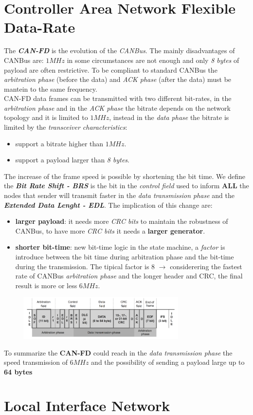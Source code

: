 \section{Controller Area Network Flexible Data-Rate}
The \textbf{\textit{CAN-FD}} is the evolution of the \textit{CANBus}. The mainly disadvantages of CANBus are: $1MHz$ in some circumstances are not enough and only \textit{8 bytes} of payload are often restrictive. To be compliant to standard CANBus the \textit{arbitration phase} (before the data) and \textit{ACK phase} (after the data) must be mantein to the same frequency. \\
CAN-FD data frames can be transmitted with two different bit-rates, in the \textit{arbitration phase} and in the \textit{ACK phase} the bitrate depends on the network topology and it is limited to $1MHz$, instead in the \textit{data phase} the bitrate is limited by the \textit{transceiver characteristics}:
\begin{itemize}[nosep]
    \item support a bitrate higher than $1MHz$.
    \item support a payload larger than \textit{8 bytes}.
\end{itemize}
The increase of the frame speed is possible by shortening the bit time. We define the \textbf{\textit{Bit Rate Shift - BRS}} is the bit in the \textit{control field} used to inform \textbf{ALL} the nodes that sender will transmit faster in the \textit{data transmission phase} and the \textbf{\textit{Extended Data Lenght - EDL}}. The implication of this change are:
\begin{itemize}[nosep]
    \item \textbf{larger payload}: it needs more \textit{CRC bits} to maintain the robustness of CANBus, to have more \textit{CRC bits} it needs a \textbf{larger generator}.
    \item \textbf{shorter bit-time}: new bit-time logic in the state machine, a \textit{factor} is introduce between the bit time during arbitration phase and the bit-time during the transmission. The tipical factor is 8 $\rightarrow$ considerering the fastest rate of CANBus \textit{arbitration phase} and the longer header and CRC, the final result is more or less $6MHz$.
\end{itemize}
\begin{figure}[h]
    \centering
    \label{img:canfd}
    \includegraphics[width=0.75\textwidth]{img/can_fd}
\end{figure}
To summarize the \textbf{CAN-FD} could reach in the \textit{data transmission phase} the speed transmission of $6MHz$ and the possibility of sending a payload large up to \textbf{64 bytes}

\newpage
\section{Local Interface Network}